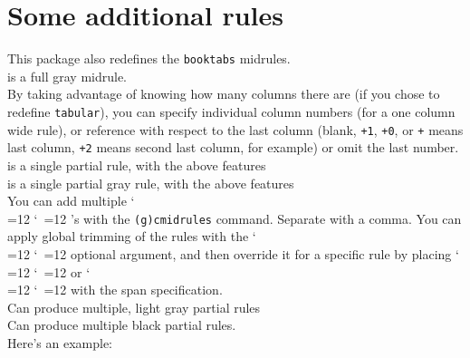 \documentclass[11pt,parskip=half]{scrartcl}
\newcommand{\llcmd}[1]{\leavevmode\llap{\texttt{\detokenize{#1}\ }}}
\def\cmd{\bgroup\catcode`\\=12 \catcode`\ =12 \cmdA}
\def\cmdA#1{\egroup{\texttt{\detokenize{#1}}}}
\begin{document}



%



\newpage


\section{Some additional rules}
This package also redefines the \texttt{booktabs} midrules.\\
\llcmd{\gmidrule}is a full gray midrule.\\
By taking advantage of knowing how many columns there are (if you chose to redefine \texttt{tabular}),
you can specify individual column numbers (for a one column wide rule),
or reference with respect to the last column (blank, \texttt{+1}, \texttt{+0}, or \texttt{+} means last column,
\texttt{+2} means second last column, for example)
or omit the last number.\\
\llcmd{\cmidrule}is a single partial rule, with the above features\\
\llcmd{\gcmidrule}is a single partial gray rule, with the above features\\
You can add multiple \cmd{cmidrule}'s with the \texttt{(g)cmidrules} command. Separate with a comma.
You can apply global trimming of the rules with the \cmd{()} optional argument, and then
override it for a specific rule by placing \cmd{r} or \cmd{l} with the span specification.\\
\llcmd{\gcmidrules}Can produce multiple, light gray partial rules\\
\llcmd{\cmidrules}Can produce multiple black partial rules.\\
Here's an example:
\end{document}
